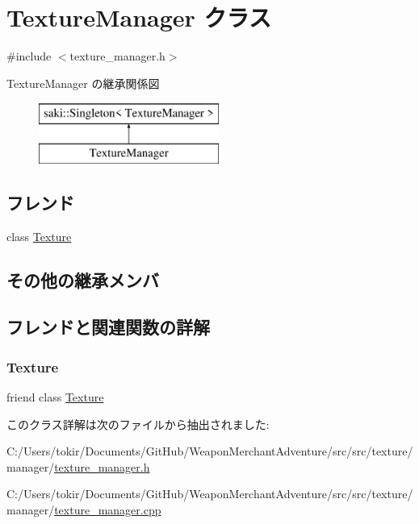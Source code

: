 \hypertarget{class_texture_manager}{}\section{Texture\+Manager クラス}
\label{class_texture_manager}


{\ttfamily \#include $<$texture\+\_\+manager.\+h$>$}

Texture\+Manager の継承関係図\begin{figure}[H]
\begin{center}
\leavevmode
\includegraphics[height=2.000000cm]{class_texture_manager}
\end{center}
\end{figure}
\subsection*{フレンド}
\begin{DoxyCompactItemize}
\item 
class \mbox{\hyperlink{class_texture_manager_af7f909106d08e36cd50aa58e36f9bf47}{Texture}}
\end{DoxyCompactItemize}
\subsection*{その他の継承メンバ}


\subsection{フレンドと関連関数の詳解}
\mbox{\label{class_texture_manager_af7f909106d08e36cd50aa58e36f9bf47}} 
\subsubsection{\texorpdfstring{Texture}{Texture}}
{\footnotesize\ttfamily friend class \mbox{\hyperlink{class_texture}{Texture}}\hspace{0.3cm}{\ttfamily [friend]}}



このクラス詳解は次のファイルから抽出されました\+:\begin{DoxyCompactItemize}
\item 
C\+:/\+Users/tokir/\+Documents/\+Git\+Hub/\+Weapon\+Merchant\+Adventure/src/src/texture/manager/\mbox{\hyperlink{texture__manager_8h}{texture\+\_\+manager.\+h}}\item 
C\+:/\+Users/tokir/\+Documents/\+Git\+Hub/\+Weapon\+Merchant\+Adventure/src/src/texture/manager/\mbox{\hyperlink{texture__manager_8cpp}{texture\+\_\+manager.\+cpp}}\end{DoxyCompactItemize}
